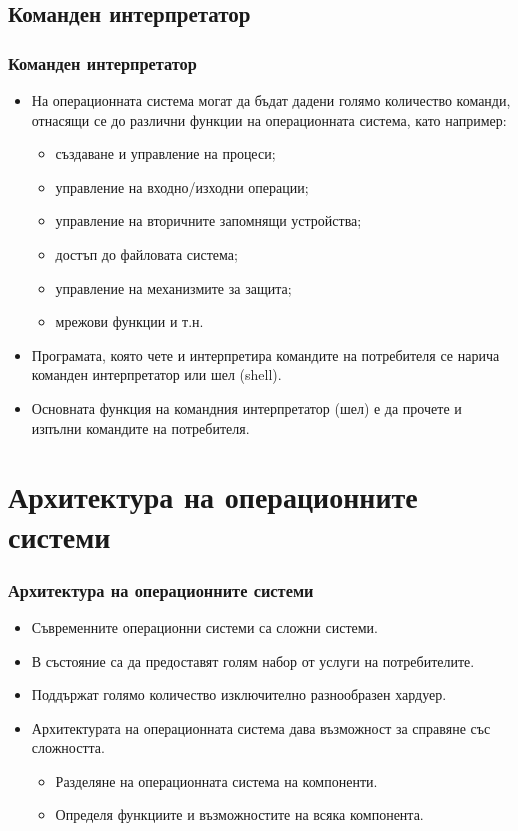 \documentclass[ignorenonframetext, hyperref=unicode]{beamer}
\begin{document}
\subsection{Команден интерпретатор}
\begin{frame}
\frametitle{Команден интерпретатор}
\begin{itemize}
\item На операционната система могат да бъдат дадени голямо количество команди,
отнасящи се до различни функции на операционната система, като например:
\begin{itemize}
  \item създаване и управление на процеси;
  \item управление на входно/изходни операции;
  \item управление на вторичните запомнящи устройства;
  \item достъп до файловата система;
  \item управление на механизмите за защита;
  \item мрежови функции и т.н.
\end{itemize}
\item Програмата, която чете и интерпретира командите на потребителя се нарича
команден интерпретатор или шел (shell).
\item Основната функция на командния интерпретатор (шел) е да прочете и изпълни
командите на потребителя.
\end{itemize}
\end{frame}






\section{Архитектура на операционните системи}

\begin{frame}
\frametitle{Архитектура на операционните системи}
\begin{itemize}
\item Съвременните операционни системи са сложни системи.
\item В състояние са да предоставят голям набор от услуги на потребителите.
\item Поддържат голямо количество изключително разнообразен хардуер.
\item Архитектурата на операционната система дава възможност за справяне със
сложността.
\begin{itemize}
  \item Разделяне на операционната система на компоненти.
  \item Определя функциите и възможностите на всяка компонента.
\end{itemize}
\end{itemize}
\end{frame}
\end{document}
